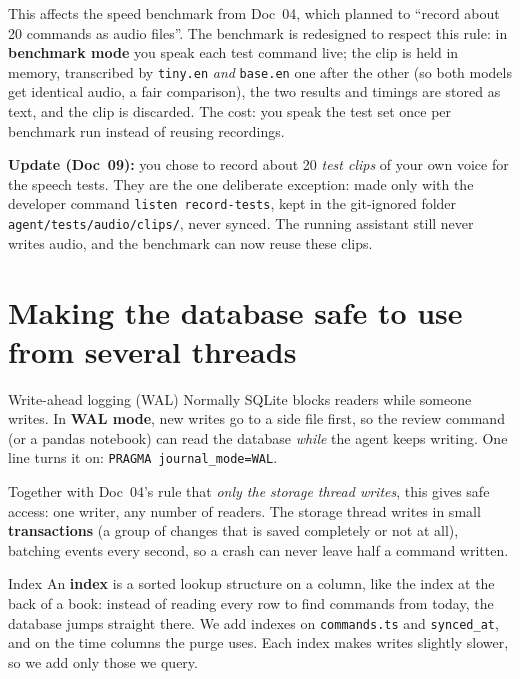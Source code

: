 \documentclass[11pt,a4paper]{article}
\begin{document}
\begin{caution}
This affects the speed benchmark from Doc~04, which planned to ``record about 20 commands as
audio files''. The benchmark is redesigned to respect this rule: in \textbf{benchmark mode} you
speak each test command live; the clip is held in memory, transcribed by \texttt{tiny.en}
\emph{and} \texttt{base.en} one after the other (so both models get identical audio, a fair
comparison), the two results and timings are stored as text, and the clip is discarded. The
cost: you speak the test set once per benchmark run instead of reusing recordings.

\textbf{Update (Doc~09):} you chose to record about 20 \emph{test clips} of your own voice for
the speech tests. They are the one deliberate exception: made only with the developer command
\texttt{listen record-tests}, kept in the git-ignored folder \texttt{agent/tests/audio/clips/},
never synced. The running assistant still never writes audio, and the benchmark can now reuse
these clips.
\end{caution}

\section{Making the database safe to use from several threads}

\begin{concept}{Write-ahead logging (WAL)}
Normally SQLite blocks readers while someone writes. In \textbf{WAL mode}, new writes go to a
side file first, so the review command (or a pandas notebook) can read the database
\emph{while} the agent keeps writing. One line turns it on:
\texttt{PRAGMA journal\_mode=WAL}.
\end{concept}

\noindent Together with Doc~04's rule that \emph{only the storage thread writes}, this gives
safe access: one writer, any number of readers. The storage thread writes in small
\textbf{transactions} (a group of changes that is saved completely or not at all), batching
events every second, so a crash can never leave half a command written.

\begin{concept}{Index}
An \textbf{index} is a sorted lookup structure on a column, like the index at the back of a
book: instead of reading every row to find commands from today, the database jumps straight
there. We add indexes on \texttt{commands.ts} and \texttt{synced\_at}, and on the time columns
the purge uses. Each index makes writes slightly slower, so we add only those we query.
\end{concept}
\end{document}
